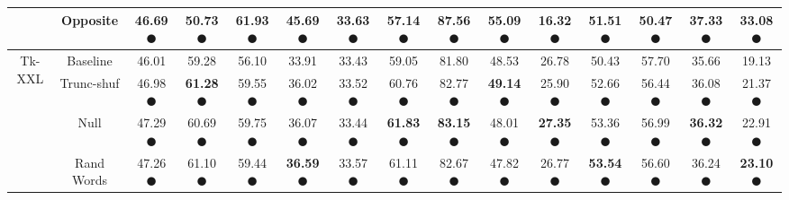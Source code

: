 \begin{table}[t]
{\begin{tabular}{@{}ccccccccccccccc@{}}
& Opposite & \textbf{46.69} \textcolor{green!60!black}{$\CIRCLE$} & \textbf{50.73} \textcolor{green!60!black}{$\CIRCLE$} & 61.93 \textcolor{green!60!black}{$\CIRCLE$} & 45.69 \textcolor{green!60!black}{$\CIRCLE$} & 33.63 \textcolor{red!60!black}{$\CIRCLE$} & 57.14 \textcolor{red!60!black}{$\CIRCLE$} & \textbf{87.56} \textcolor{green!60!black}{$\CIRCLE$} & 55.09 \textcolor{red!60!black}{$\CIRCLE$} & 16.32 \textcolor{red!60!black}{$\CIRCLE$} & 51.51 \textcolor{red!60!black}{$\CIRCLE$} & 50.47 \textcolor{green!60!black}{$\CIRCLE$} & \textbf{37.33} \textcolor{green!60!black}{$\CIRCLE$} & \textbf{33.08} \textcolor{green!60!black}{$\CIRCLE$} \\ 
 \midrule
\multirow{5}{*}{Tk-XXL} 
& Baseline &46.01&	59.28&	56.10&	33.91&	33.43&	59.05&	81.80&	48.53&	26.78&	50.43&	57.70&	35.66&	19.13 \\
& Trunc-shuf & 46.98 \textcolor{green!60!black}{$\CIRCLE$} & \textbf{61.28} \textcolor{green!60!black}{$\CIRCLE$} & 59.55 \textcolor{green!60!black}{$\CIRCLE$} & 36.02 \textcolor{green!60!black}{$\CIRCLE$} & 33.52 \textcolor{green!60!black}{$\CIRCLE$} & 60.76 \textcolor{green!60!black}{$\CIRCLE$} & 82.77 \textcolor{green!60!black}{$\CIRCLE$} & \textbf{49.14} \textcolor{green!60!black}{$\CIRCLE$} & 25.90 \textcolor{red!60!black}{$\CIRCLE$} & 52.66 \textcolor{green!60!black}{$\CIRCLE$} & 56.44 \textcolor{red!60!black}{$\CIRCLE$} & 36.08 \textcolor{green!60!black}{$\CIRCLE$} & 21.37 \textcolor{green!60!black}{$\CIRCLE$} \\
& Null & 47.29 \textcolor{green!60!black}{$\CIRCLE$} & 60.69 \textcolor{green!60!black}{$\CIRCLE$} & 59.75 \textcolor{green!60!black}{$\CIRCLE$} & 36.07 \textcolor{green!60!black}{$\CIRCLE$} & 33.44 \textcolor{green!60!black}{$\CIRCLE$} & \textbf{61.83} \textcolor{green!60!black}{$\CIRCLE$} & \textbf{83.15} \textcolor{green!60!black}{$\CIRCLE$} & 48.01 \textcolor{red!60!black}{$\CIRCLE$} & \textbf{27.35} \textcolor{green!60!black}{$\CIRCLE$} & 53.36 \textcolor{green!60!black}{$\CIRCLE$} & 56.99 \textcolor{red!60!black}{$\CIRCLE$} & \textbf{36.32} \textcolor{green!60!black}{$\CIRCLE$} & 22.91 \textcolor{green!60!black}{$\CIRCLE$} \\
& Rand Words & 47.26 \textcolor{green!60!black}{$\CIRCLE$} & 61.10 \textcolor{green!60!black}{$\CIRCLE$} & 59.44 \textcolor{green!60!black}{$\CIRCLE$} & \textbf{36.59} \textcolor{green!60!black}{$\CIRCLE$} & 33.57 \textcolor{green!60!black}{$\CIRCLE$} & 61.11 \textcolor{green!60!black}{$\CIRCLE$} & 82.67 \textcolor{green!60!black}{$\CIRCLE$} & 47.82 \textcolor{red!60!black}{$\CIRCLE$} & 26.77 \textcolor{red!60!black}{$\CIRCLE$} & \textbf{53.54} \textcolor{green!60!black}{$\CIRCLE$} & 56.60 \textcolor{red!60!black}{$\CIRCLE$} & 36.24 \textcolor{green!60!black}{$\CIRCLE$} & \textbf{23.10} \textcolor{green!60!black}{$\CIRCLE$} \\

\end{tabular}}
\end{table}
